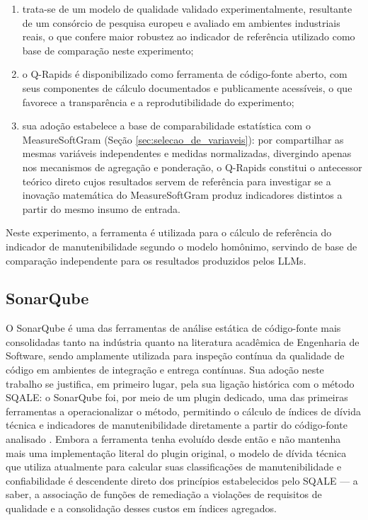 \begin{enumerate}[leftmargin=2\parindent]
	\item trata-se de um modelo de qualidade validado experimentalmente, resultante de um consórcio de pesquisa europeu e avaliado em ambientes industriais reais, o que confere maior robustez ao indicador de referência utilizado como base de comparação neste experimento;

	\item o Q-Rapids é disponibilizado como ferramenta de código-fonte aberto, com seus componentes de cálculo documentados e publicamente acessíveis, o que favorece a transparência e a reprodutibilidade do experimento;

	\item sua adoção estabelece a base de comparabilidade estatística com o MeasureSoftGram (Seção \ref{sec:selecao_de_variaveis}): por compartilhar as mesmas variáveis independentes e medidas normalizadas, divergindo apenas nos mecanismos de agregação e ponderação, o Q-Rapids constitui o antecessor teórico direto cujos resultados servem de referência para investigar se a inovação matemática do MeasureSoftGram produz indicadores distintos a partir do mesmo insumo de entrada.
\end{enumerate}

Neste experimento, a ferramenta é utilizada para o cálculo de referência do indicador de manutenibilidade segundo o modelo homônimo, servindo de base de comparação independente para os resultados produzidos pelos LLMs.

\subsection{SonarQube}
\label{sec:sonarqube_justificativa}

O SonarQube é uma das ferramentas de análise estática de código-fonte mais consolidadas tanto na indústria quanto na literatura acadêmica de Engenharia de Software, sendo amplamente utilizada para inspeção contínua da qualidade de código em ambientes de integração e entrega contínuas. Sua adoção neste trabalho se justifica, em primeiro lugar, pela sua ligação histórica com o método SQALE: o SonarQube foi, por meio de um plugin dedicado, uma das primeiras ferramentas a operacionalizar o método, permitindo o cálculo de índices de dívida técnica e indicadores de manutenibilidade diretamente a partir do código-fonte analisado . Embora a ferramenta tenha evoluído desde então e não mantenha mais uma implementação literal do plugin original, o modelo de dívida técnica que utiliza atualmente para calcular suas classificações de manutenibilidade e confiabilidade é descendente direto dos princípios estabelecidos pelo SQALE --- a saber, a associação de funções de remediação a violações de requisitos de qualidade e a consolidação desses custos em índices agregados.

